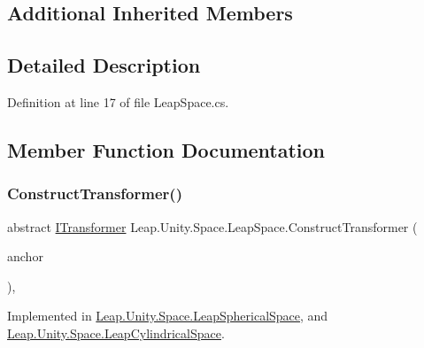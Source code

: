 \subsection*{Additional Inherited Members}


\subsection{Detailed Description}


Definition at line 17 of file Leap\+Space.\+cs.



\subsection{Member Function Documentation}
\mbox{\label{class_leap_1_1_unity_1_1_space_1_1_leap_space_af6ff18ae47b473989e65d321da089948}} 
\subsubsection{\texorpdfstring{ConstructTransformer()}{ConstructTransformer()}}
{\footnotesize\ttfamily abstract \mbox{\hyperlink{interface_leap_1_1_unity_1_1_space_1_1_i_transformer}{I\+Transformer}} Leap.\+Unity.\+Space.\+Leap\+Space.\+Construct\+Transformer (\begin{DoxyParamCaption}\item[{\mbox{\hyperlink{class_leap_1_1_unity_1_1_space_1_1_leap_space_anchor}{Leap\+Space\+Anchor}}}]{anchor }\end{DoxyParamCaption})\hspace{0.3cm}{\ttfamily [protected]}, {}}



Implemented in \mbox{\hyperlink{class_leap_1_1_unity_1_1_space_1_1_leap_spherical_space_ac252ca6d47afef536236b55a34e3f416}{Leap.\+Unity.\+Space.\+Leap\+Spherical\+Space}}, and \mbox{\hyperlink{class_leap_1_1_unity_1_1_space_1_1_leap_cylindrical_space_ae0d1e2b264077a2f5075a239903a91d9}{Leap.\+Unity.\+Space.\+Leap\+Cylindrical\+Space}}.

\mbox{\label{class_leap_1_1_unity_1_1_space_1_1_leap_space_a344e65e7be98cd41ba6c6804b283f681}} 
